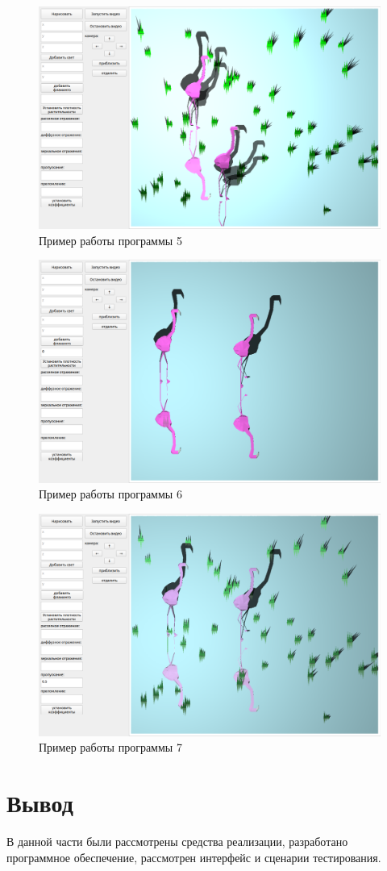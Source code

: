 \begin{figure}[h!]
	\centering
	\includegraphics[width=0.9\linewidth]{img/ex5}
	\caption{Пример работы программы 5}
	\label{fig:ex5}
\end{figure}

\begin{figure}[h!]
	\centering
	\includegraphics[width=0.9\linewidth]{img/ex7}
	\caption{Пример работы программы 6}
	\label{fig:ex6}
\end{figure}

\begin{figure}[h!]
	\centering
	\includegraphics[width=0.9\linewidth]{img/ex6}
	\caption{Пример работы программы 7}
	\label{fig:ex7}
\end{figure}
\clearpage


\section*{Вывод}

В данной части были рассмотрены средства реализации, разработано программное обеспечение, рассмотрен интерфейс и сценарии тестирования.
